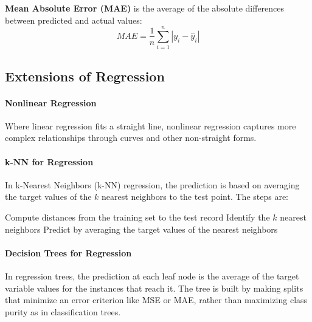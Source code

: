\begin{definition}
\textbf{Mean Absolute Error (MAE)} is the average of the absolute differences between predicted and actual values:
\begin{equation}
MAE = \frac{1}{n} \sum_{i=1}^{n} |y_i - \hat{y}_i|
\end{equation}
\end{definition}

\subsection{Extensions of Regression}

\paragraph{Nonlinear Regression}  
Where linear regression fits a straight line, nonlinear regression captures more complex relationships through curves and other non-straight forms.

\paragraph{k-NN for Regression}  
In k-Nearest Neighbors (k-NN) regression, the prediction is based on averaging the target values of the \(k\) nearest neighbors to the test point. The steps are:

\begin{algorithm}
\caption{k-NN for Regression}
\begin{algorithmic}[1]
\State Compute distances from the training set to the test record
\State Identify the \(k\) nearest neighbors
\State Predict by averaging the target values of the nearest neighbors
\end{algorithmic}
\end{algorithm}

\paragraph{Decision Trees for Regression}  
In regression trees, the prediction at each leaf node is the average of the target variable values for the instances that reach it. The tree is built by making splits that minimize an error criterion like MSE or MAE, rather than maximizing class purity as in classification trees.
